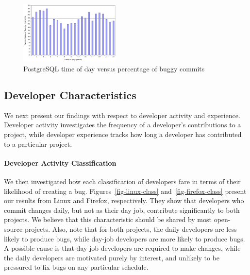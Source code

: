 \begin{figure}
\begin{center}
\includegraphics[width=0.45\textwidth]{postgresql-bugginess-hour.pdf}
\end{center}
\caption{PostgreSQL time of day versus percentage of buggy commits}
\label{fig-postgresql-bugginess-hour}
\end{figure}



\subsection{Developer Characteristics}
We next present our findings with respect to developer activity and
experience.  Developer activity investigates the frequency of a developer's
contributions to a project, while developer experience tracks how long
a developer has contributed to a particular project.


\paragraph{Developer Activity Classification} 
We then investigated how each classification of developers fare in
terms of their likelihood of creating a
bug. Figures~\ref{fig-linux-class} and~\ref{fig-firefox-class} present
our results from Linux and Firefox, respectively.  They show that
developers who commit changes daily, but not as their day job,
contribute significantly to both projects. We believe that this
characteristic should be shared by most open-source projects. Also,
note that for both projects, the daily developers are less likely to
produce bugs, while day-job developers
are more likely to produce bugs. %
A possible cause is that day-job developers are required to make changes,
while the daily developers are motivated purely by interest, and
unlikely to be pressured to fix bugs on any particular schedule.

